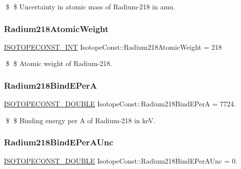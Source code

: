 \$ \$ Uncertainty in atomic mass of Radium-\/218 in amu. \mbox{\label{group___isotope_const-_radium-_ra218_ga18c036a2c9a7d29d07e9b0b437cc6f24}} 
\subsubsection{\texorpdfstring{Radium218\+Atomic\+Weight}{Radium218AtomicWeight}}
{\footnotesize\ttfamily \mbox{\hyperlink{group___isotope_const-_macros_ga5f18360b3e99483a35c32d789e62621c}{I\+S\+O\+T\+O\+P\+E\+C\+O\+N\+S\+T\+\_\+\+I\+NT}} Isotope\+Const\+::\+Radium218\+Atomic\+Weight = 218}

\$ \$ Atomic weight of Radium-\/218. \mbox{\label{group___isotope_const-_radium-_ra218_ga16710ac55004e52e3654d32f5bdbfc7b}} 
\subsubsection{\texorpdfstring{Radium218\+Bind\+E\+PerA}{Radium218BindEPerA}}
{\footnotesize\ttfamily \mbox{\hyperlink{group___isotope_const-_macros_ga8f45a7272ce02c0b4c65c44636ed719a}{I\+S\+O\+T\+O\+P\+E\+C\+O\+N\+S\+T\+\_\+\+D\+O\+U\+B\+LE}} Isotope\+Const\+::\+Radium218\+Bind\+E\+PerA = 7724.}

\$ \$ Binding energy per A of Radium-\/218 in keV. \mbox{\label{group___isotope_const-_radium-_ra218_ga20a20cd0eb634d9aeb16e0ce18ce6583}} 
\subsubsection{\texorpdfstring{Radium218\+Bind\+E\+Per\+A\+Unc}{Radium218BindEPerAUnc}}
{\footnotesize\ttfamily \mbox{\hyperlink{group___isotope_const-_macros_ga8f45a7272ce02c0b4c65c44636ed719a}{I\+S\+O\+T\+O\+P\+E\+C\+O\+N\+S\+T\+\_\+\+D\+O\+U\+B\+LE}} Isotope\+Const\+::\+Radium218\+Bind\+E\+Per\+A\+Unc = 0.}


